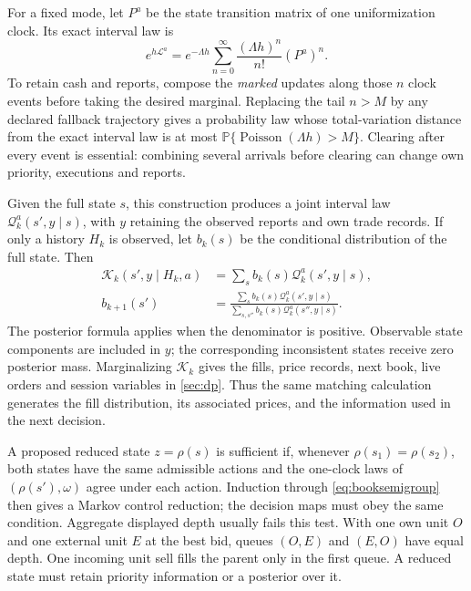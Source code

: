 \documentclass[11pt]{article}
\numberwithin{equation}{section}
\theoremstyle{definition}
\theoremstyle{remark}
\theoremstyle{definition}
\newcommand{\Pp}{\mathbb P}
\newcommand{\K}{\mathcal K}
\begin{document}
For a fixed mode, let $P^a$ be the state transition matrix of one
uniformization clock. Its exact interval law is
\begin{equation}\label{eq:booksemigroup}
 e^{h\mathscr L^a}=
 e^{-\Lambda h}\sum_{n=0}^\infty
       \frac{(\Lambda h)^n}{n!}(P^a)^n.
\end{equation}
To retain cash and reports, compose the \emph{marked} updates along those
$n$ clock events before taking the desired marginal. Replacing the tail
$n>M$ by any declared fallback trajectory gives a probability law whose
total-variation distance from the exact interval law is at most
$\Pp\{\operatorname{Poisson}(\Lambda h)>M\}$. Clearing after every event
is essential: combining several arrivals before clearing can change own
priority, executions and reports.

Given the full state $s$, this construction produces a joint interval law
$\mathcal Q_k^a(s',y\mid s)$, with $y$ retaining the observed reports and
own trade records. If only a history $H_k$ is observed, let $b_k(s)$ be the
conditional distribution of the full state. Then
\begin{align}\label{eq:bookfilter}
 \K_k(s',y\mid H_k,a)&=\sum_s b_k(s)\mathcal Q_k^a(s',y\mid s),\\
 b_{k+1}(s')&=
 \frac{\sum_s b_k(s)\mathcal Q_k^a(s',y\mid s)}
 {\sum_{s,s''}b_k(s)\mathcal Q_k^a(s'',y\mid s)}.\nonumber
\end{align}
The posterior formula applies when the denominator is positive. Observable
state components are included in $y$; the corresponding inconsistent states
receive zero posterior mass. Marginalizing $\K_k$ gives the fills, price
records, next book, live orders and session variables in \cref{sec:dp}.
Thus the same matching calculation generates the fill distribution, its
associated prices, and the information used in the next decision.

A proposed reduced state $z=\rho(s)$ is sufficient if, whenever
$\rho(s_1)=\rho(s_2)$, both states have the same admissible actions and the
one-clock laws of $(\rho(s'),\omega)$ agree under each action. Induction
through \eqref{eq:booksemigroup} then gives a Markov control reduction; the
decision maps must obey the same condition. Aggregate displayed depth
usually fails this test. With one own unit $O$ and one external unit $E$
at the best bid, queues $(O,E)$ and $(E,O)$ have equal depth. One incoming
unit sell fills the parent only in the first queue. A reduced state must
retain priority information or a posterior over it.
\end{document}
